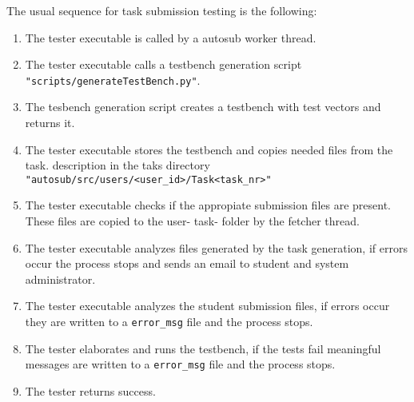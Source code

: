 The usual sequence for task submission testing is the following:
\begin{enumerate}
\item The tester executable is called by a autosub worker thread.
\item The tester executable calls a testbench generation script
    {\tt "scripts/generateTestBench.py"}.
\item The tesbench generation script creates a testbench with test vectors and returns it.
\item The tester executable stores the testbench and copies needed files from the task.
    description in the taks directory {\tt "autosub/src/users/<user\_id>/Task<task\_nr>"}
\item The tester executable checks if the appropiate submission files are present.
    These files are copied to the user- task- folder by the fetcher thread.
\item The tester executable analyzes files generated by the task generation, if errors
    occur the process stops and sends an email to student and system administrator.
\item The tester executable analyzes the student submission files, if errors occur they
    are written to a {\tt error\_msg} file and the process stops.
\item The tester elaborates and runs the testbench, if the tests fail meaningful messages
    are written to a {\tt error\_msg} file and the process stops.
\item The tester returns success.
\end{enumerate}
